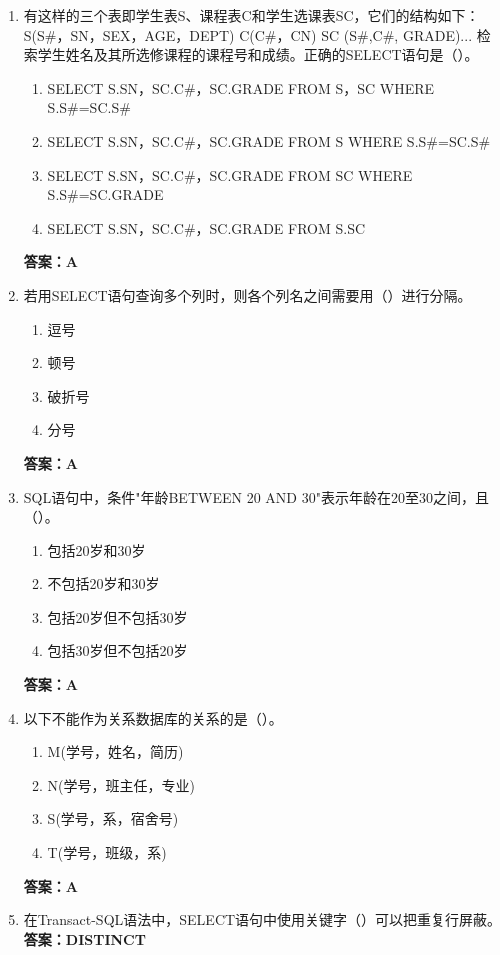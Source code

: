 \documentclass[12pt, a4paper]{article}
\begin{document}
\begin{enumerate}[label=\arabic*.]
	\item 有这样的三个表即学生表S、课程表C和学生选课表SC，它们的结构如下：S(S\#，SN，SEX，AGE，DEPT) C(C\#，CN) SC (S\#,C\#, GRADE)... 检索学生姓名及其所选修课程的课程号和成绩。正确的SELECT语句是（\quad）。
	      \begin{enumerate}
		      \item SELECT S.SN，SC.C\#，SC.GRADE FROM S，SC WHERE S.S\#=SC.S\#
		      \item SELECT S.SN，SC.C\#，SC.GRADE FROM S WHERE S.S\#=SC.S\#
		      \item SELECT S.SN，SC.C\#，SC.GRADE FROM SC WHERE S.S\#=SC.GRADE
		      \item SELECT S.SN，SC.C\#，SC.GRADE FROM S.SC
	      \end{enumerate}
	      \textbf{答案：A}

	\item 若用SELECT语句查询多个列时，则各个列名之间需要用（\quad）进行分隔。
	      \begin{enumerate}
		      \item 逗号
		      \item 顿号
		      \item 破折号
		      \item 分号
	      \end{enumerate}
	      \textbf{答案：A}

	\item SQL语句中，条件"年龄BETWEEN 20 AND 30"表示年龄在20至30之间，且（\quad）。
	      \begin{enumerate}
		      \item 包括20岁和30岁
		      \item 不包括20岁和30岁
		      \item 包括20岁但不包括30岁
		      \item 包括30岁但不包括20岁
	      \end{enumerate}
	      \textbf{答案：A}

	\item 以下不能作为关系数据库的关系的是（\quad）。
	      \begin{enumerate}
		      \item M(学号，姓名，简历)
		      \item N(学号，班主任，专业)
		      \item S(学号，系，宿舍号)
		      \item T(学号，班级，系)
	      \end{enumerate}
	      \textbf{答案：A}

	\item 在Transact-SQL语法中，SELECT语句中使用关键字（\quad）可以把重复行屏蔽。
	      \textbf{答案：DISTINCT}


\end{enumerate}
\end{document}
